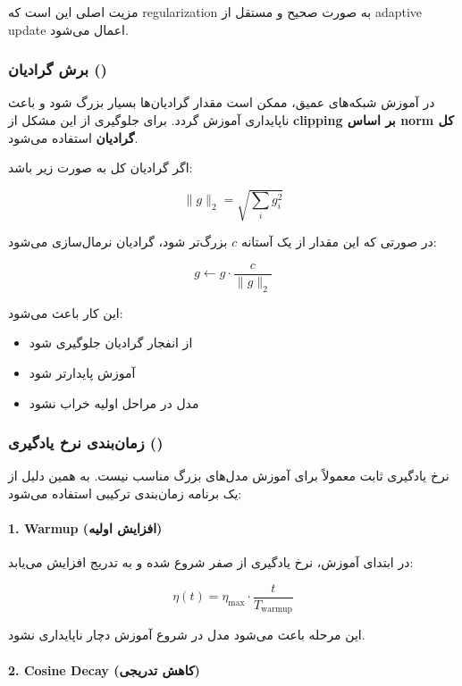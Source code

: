 \documentclass{article}
\begin{document}
مزیت اصلی  این است که regularization به صورت صحیح و مستقل از adaptive update اعمال می‌شود.

\subsubsection*{برش گرادیان ()}

در آموزش شبکه‌های عمیق، ممکن است مقدار گرادیان‌ها بسیار بزرگ شود و باعث ناپایداری آموزش گردد. برای جلوگیری از این مشکل از \textbf{clipping بر اساس norm کل گرادیان} استفاده می‌شود.

اگر گرادیان کل به صورت زیر باشد:

\[
\|g\|_2 = \sqrt{\sum_i g_i^2}
\]

در صورتی که این مقدار از یک آستانه \( c \) بزرگ‌تر شود، گرادیان نرمال‌سازی می‌شود:

\[
g \leftarrow g \cdot \frac{c}{\|g\|_2}
\]

این کار باعث می‌شود:

\begin{itemize}
	\item از انفجار گرادیان جلوگیری شود
	\item آموزش پایدارتر شود
	\item مدل در مراحل اولیه خراب نشود
\end{itemize}

\subsubsection*{زمان‌بندی نرخ یادگیری ()}

نرخ یادگیری ثابت معمولاً برای آموزش مدل‌های بزرگ مناسب نیست. به همین دلیل از یک برنامه زمان‌بندی ترکیبی استفاده می‌شود:

\paragraph{1. Warmup (افزایش اولیه)}

در ابتدای آموزش، نرخ یادگیری از صفر شروع شده و به تدریج افزایش می‌یابد:

\[
\eta(t) = \eta_{\max} \cdot \frac{t}{T_{\text{warmup}}}
\]

این مرحله باعث می‌شود مدل در شروع آموزش دچار ناپایداری نشود.

\paragraph{2. Cosine Decay (کاهش تدریجی)}
\end{document}
